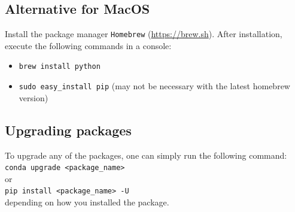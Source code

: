 \documentclass[oldfontcommands,openany,oneside]{memoir}
\begin{document}


\subsection{Alternative for MacOS}
Install the package manager \texttt{Homebrew} (\href{https://brew.sh}{https://brew.sh}). After installation, execute the following commands in a console:
\begin{itemize}
\item \texttt{brew install python}
\item \texttt{sudo easy\_install pip} (may not be necessary with the latest homebrew version)
\end{itemize}

\subsection{Upgrading packages}
To upgrade any of the packages, one can simply run the following command:
\verb+conda upgrade <package_name>+\\
or\\
\verb+pip install <package_name> -U+\\
depending on how you installed the package.
\end{document}
